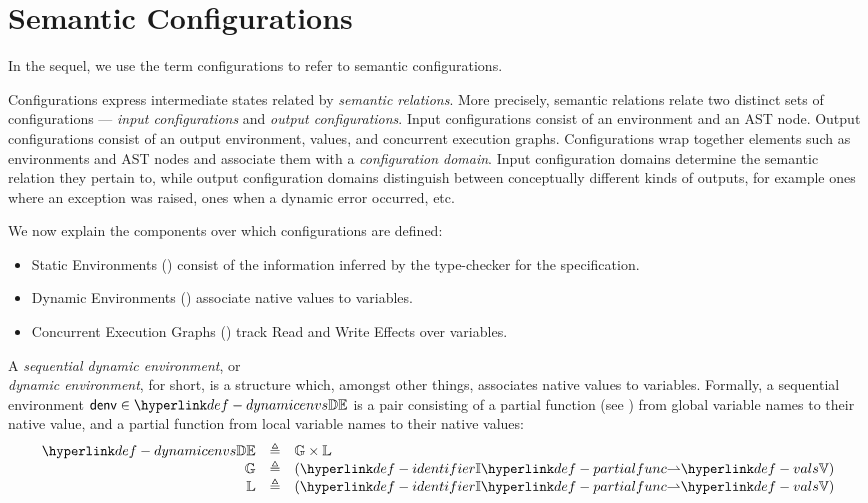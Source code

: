 \documentclass{book}
\begin{document}
\section{Semantic Configurations \label{sec:configurations}}

In the sequel, we use the term configurations to refer to semantic configurations.

Configurations express intermediate states related by \emph{semantic relations}.
%
More precisely, semantic relations relate two distinct sets of configurations ---
\emph{input configurations} and \emph{output configurations}.
Input configurations consist of an environment and an AST node.
Output configurations consist of an output environment, values,
and concurrent execution graphs.
%
Configurations wrap together elements such as environments and AST nodes
and associate them with a \emph{configuration domain}. Input configuration domains
determine the semantic relation they pertain to, while output configuration
domains distinguish between conceptually different kinds of outputs, for example
ones where an exception was raised, ones when a dynamic error occurred, etc.

We now explain the components over which configurations are defined:
\begin{itemize}
  \item Static Environments () consist of the information inferred
  by the type-checker for the specification.
  \item Dynamic Environments () associate native values to variables.
  \item Concurrent Execution Graphs () track Read and Write Effects over variables.
\end{itemize}

\hypertarget{def-dynamicenvs}{}
\begin{definition}
A \emph{sequential dynamic environment}, or \\ \emph{dynamic environment}, for short, is a structure which,
amongst other things, associates native values to variables.
Formally, a sequential environment $\denv \in \dynamicenvs$ is a pair consisting of a partial function
(see ) from global
variable names to their native value, and a partial function from local variable names to their
native values:
\[
\begin{array}{rcl}
  \dynamicenvs          &\triangleq&  \mathbb{G} \times \mathbb{L} \\
  \mathbb{G}            &\triangleq&  (\Identifiers \partialto \vals) \\
  \mathbb{L}            &\triangleq&  (\Identifiers \partialto \vals) \\
\end{array}
\]
\end{definition}
\end{document}

